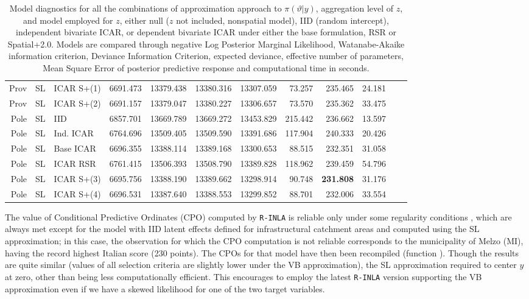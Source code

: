 \documentclass[openany, 11pt, oneside]{book}
\begin{document}
\begin{subappendices}
\begin{table}[ht]
{\begin{tabular}{rlllrrrrrrrr}
  Prov & SL & ICAR S+(1) & 6691.473 & 13379.438 & 13380.316 & 13307.059 & 73.257 & 235.465 & 24.181 \\ 
  Prov & SL & ICAR S+(2) & 6691.157 & 13379.047 & 13380.227 & 13306.657 & 73.570 & 235.362 & 33.475 \\ 
  Pole & SL & IID & 6857.701\footnotemark[1]  & 13669.789 & 13669.272 & 13453.829 & 215.442 & 236.662 & 13.597 \\ 
  Pole & SL & Ind. ICAR & 6764.696 & 13509.405 & 13509.590 & 13391.686 & 117.904 & 240.333 & 20.426 \\ 
  Pole & SL & Base ICAR & 6696.355 & 13388.114 & 13389.168 & 13300.653 & 88.515 & 232.351 & 31.058 \\ 
  Pole & SL & ICAR RSR & 6761.415 & 13506.393 & 13508.790 & 13389.828 & 118.962 & 239.459 & 54.796 \\ 
  Pole & SL & ICAR S+(3) & 6695.756 & 13388.190 & 13389.662 & 13298.914 & 90.748 & \textbf{231.808} & 31.176 \\  
  Pole & SL & ICAR S+(4) & 6696.531 & 13387.640 & 13388.553 & 13299.852 & 88.701 & 232.006 & 33.554 \\ 
    \bottomrule \end{tabular}
    }
      \captionsetup{width=0.9\textwidth}
\caption{Model diagnostics for all the combinations of approximation approach to $\pi(\vartheta | y)$, aggregation level of $z$, and model employed for $z$, either null ($z$ not included, nonspatial model), IID (random intercept), independent bivariate ICAR, or dependent bivariate ICAR under either the base formulation, RSR or Spatial+2.0. Models are compared through negative Log Posterior Marginal Likelihood, Watanabe-Akaike information criterion, Deviance Information Criterion, expected deviance, effective number of parameters, Mean Square Error of posterior predictive response and computational time in seconds.}
\label{tab:ICAR}
\end{table}

The value of Conditional Predictive Ordinates (CPO) computed by \texttt{R-INLA} is reliable only under some regularity conditions \parencite{CPOINLA}, which are always met except for the model with IID latent effects defined for infrastructural catchment areas and computed using the SL approximation; in this case, the observation for which the CPO computation is not reliable corresponds to the municipality of Melzo (MI), having the record highest Italian score (230 points). The CPOs for that model have then been recompiled (function \texttt{}). 
Though the results are quite similar (values of all selection criteria are slightly lower under the VB approximation), the SL approximation required to center $y$ at zero, other than being less computationally efficient. This encourages to employ the latest \texttt{R-INLA} version supporting the VB approximation even if we have a skewed likelihood for one of the two target variables.


\end{subappendices}
\end{document}
